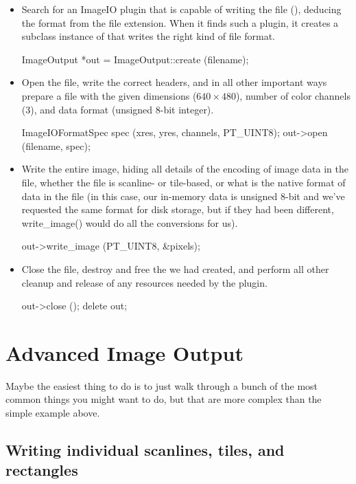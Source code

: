 \begin{itemize}
\item Search for an ImageIO plugin that is capable of writing the file
  (), deducing the format from the file extension.  When it
  finds such a plugin, it creates a subclass instance of \ImageOutput
  that writes the right kind of file format.
  \begin{code}
        ImageOutput *out = ImageOutput::create (filename);
  \end{code}
\item Open the file, write the correct headers, and in all other
  important ways prepare a file with the given dimensions ($640 \times
  480$), number of color channels (3), and data format (unsigned 8-bit
  integer).
  \begin{code}
        ImageIOFormatSpec spec (xres, yres, channels, PT_UINT8);
        out->open (filename, spec);
  \end{code}
\item Write the entire image, hiding all details of the encoding of
  image data in the file, whether the file is scanline- or tile-based,
  or what is the native format of data in the file (in this case, our
  in-memory data is unsigned 8-bit and we've requested the same format
  for disk storage, but if they had been different, {\kw write_image()}
  would do all the conversions for us).
  \begin{code}
        out->write_image (PT_UINT8, &pixels);
  \end{code}
\item Close the file, destroy and free the \ImageOutput we had created,
  and perform all other cleanup and release of any resources needed by
  the plugin.
  \begin{code}
        out->close ();
        delete out;
  \end{code}
\end{itemize}



\section{Advanced Image Output}
\label{sec:imageoutput:advanced}

Maybe the easiest thing to do is to just walk through a bunch of the
most common things you might want to do, but that are more complex than
the simple example above.

\subsection{Writing individual scanlines, tiles, and rectangles}
\label{sec:imageoutput:scanlinestiles}

